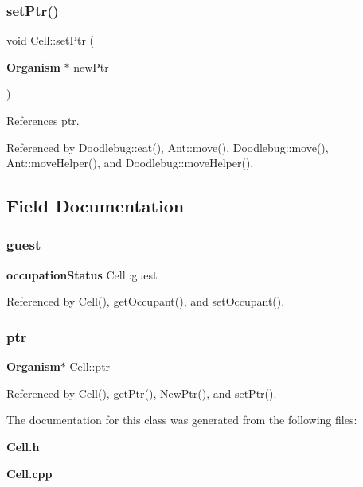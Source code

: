 \subsubsection{set\+Ptr()}
{\footnotesize\ttfamily void Cell\+::set\+Ptr (\begin{DoxyParamCaption}\item[{\textbf{ Organism} $\ast$}]{new\+Ptr }\end{DoxyParamCaption})}



References ptr.



Referenced by Doodlebug\+::eat(), Ant\+::move(), Doodlebug\+::move(), Ant\+::move\+Helper(), and Doodlebug\+::move\+Helper().



\subsection{Field Documentation}
\mbox{\label{classCell_aafc273a5125cf29742a8df6f5a5a881c}} 
\subsubsection{guest}
{\footnotesize\ttfamily \textbf{ occupation\+Status} Cell\+::guest}



Referenced by Cell(), get\+Occupant(), and set\+Occupant().

\mbox{\label{classCell_a0f787af5a8409c38ded198420fe8afae}} 
\subsubsection{ptr}
{\footnotesize\ttfamily \textbf{ Organism}$\ast$ Cell\+::ptr}



Referenced by Cell(), get\+Ptr(), New\+Ptr(), and set\+Ptr().



The documentation for this class was generated from the following files\+:\begin{DoxyCompactItemize}
\item 
\textbf{ Cell.\+h}\item 
\textbf{ Cell.\+cpp}\end{DoxyCompactItemize}
